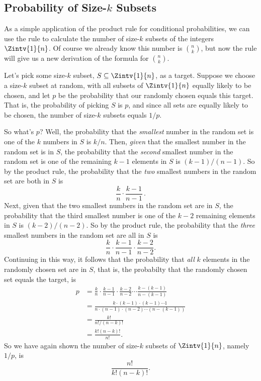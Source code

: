 \subsection{Probability of Size-$k$ Subsets}
As a simple application of the product rule for conditional
probabilities, we can use the rule to calculate the number of size-$k$
subsets of the integers $\Zintv{1}{n}$.  Of course we already know
this number is $\binom{n}{k}$, but now the rule will give us a new
derivation of the formula for $\binom{n}{k}$.

Let's pick some size-$k$ subset, $S \subseteq \Zintv{1}{n}$, as a
target.  Suppose we choose a size-$k$ subset at random, with all
subsets of $\Zintv{1}{n}$ equally likely to be chosen, and let $p$ be
the probability that our randomly chosen equals this target.  That is,
the probability of picking $S$ is $p$, and since all sets are equally
likely to be chosen, the number of size-$k$ subsets equals $1/p$.

So what's $p$?  Well, the probability that the \emph{smallest} number
in the random set is one of the $k$ numbers in $S$ is $k/n$.  Then,
\emph{given} that the smallest number in the random set is in $S$, the
probability that the \emph{second} smallest number in the random set
is one of the remaining $k-1$ elements in $S$ is $(k-1)/(n-1)$.  So by
the product rule, the probability that the \emph{two} smallest numbers
in the random set are both in $S$ is
\[
\frac{k}{n} \cdot \frac{k-1}{n-1}\, .
\]
Next, given that the two smallest numbers in the random set are in
$S$, the probability that the third smallest number is one of the
$k-2$ remaining elements in $S$ is $(k-2)/(n-2)$.  So by the product
rule, the probability that the \emph{three} smallest numbers in the
random set are all in $S$ is
\[
\frac{k}{n} \cdot \frac{k-1}{n-1} \cdot \frac{k-2}{n-2}.
\]
Continuing in this way, it follows that the probability that
\emph{all} $k$ elements in the randomly chosen set are in $S$, that is, the probabilty that the randomly chosen set equals the target, is
\begin{align*}
p & = \frac{k}{n} \cdot \frac{k-1}{n-1} \cdot \frac{k-2}{n-2}
              \cdots \frac{k-(k-1)}{n-(k-1)}\\
  & = \frac{k \cdot (k-1) \cdot (k-1) \cdots 1}%
           {n \cdot (n-1) \cdot (n-2) \cdots (n-(k-1))}\\
  & = \frac{k!}{n!/(n-k)!}\\
  & = \frac{k!(n-k)!}{n!}.
\end{align*}
So we have again shown the number of size-$k$ subsets of $\Zintv{1}{n}$,
namely $1/p$, is
\[
\frac{n!}{k!(n-k)!}.
\]


